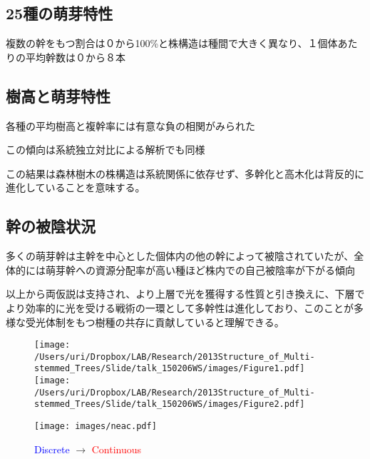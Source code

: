 \documentclass[a0, 36pt, plainboxedsections]{sciposter} %
\begin{document}
\begin{multicols}{3}

\subsection*{25種の萌芽特性}

複数の幹をもつ割合は０から100\%と株構造は種間で大きく異なり、１個体あたりの平均幹数は０から８本

\subsection*{樹高と萌芽特性}

\begin{list}{}{\setlength{\itemindent}{1em}}
  \item 各種の平均樹高と複幹率には有意な負の相関がみられた
  \item この傾向は系統独立対比による解析でも同様
\end{list}

この結果は森林樹木の株構造は系統関係に依存せず、多幹化と高木化は背反的に進化していることを意味する。


\subsection*{幹の被陰状況}

多くの萌芽幹は主幹を中心とした個体内の他の幹によって被陰されていたが、全体的には萌芽幹への資源分配率が高い種ほど株内での自己被陰率が下がる傾向

以上から両仮説は支持され、より上層で光を獲得する性質と引き換えに、下層でより効率的に光を受ける戦術の一環として多幹性は進化しており、このことが多様な受光体制をもつ樹種の共存に貢献していると理解できる。

\begin{figure}
	\begin{center}
		\texttt{[image: /Users/uri/Dropbox/LAB/Research/2013Structure\_of\_Multi-stemmed\_Trees/Slide/talk\_150206WS/images/Figure1.pdf]}
		\texttt{[image: /Users/uri/Dropbox/LAB/Research/2013Structure\_of\_Multi-stemmed\_Trees/Slide/talk\_150206WS/images/Figure2.pdf]}
	\end{center}
\end{figure}

\begin{figure}[H]
  \begin{center}
	\texttt{[image: images/neac.pdf]}
	{\small\caption{{\textcolor{blue}{Discrete}} $\rightarrow$ {\textcolor{red}{Continuous}}}}
  \end{center}
\end{figure}

\end{multicols}
\end{document}
